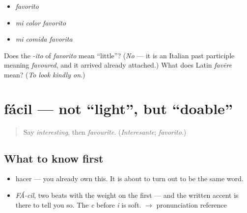 \begin{itemize}
\raggedright
  \item \emph{favorito}
  \item \emph{mi color favorito}
  \item \emph{mi comida favorita}
\end{itemize}

\begin{tcolorbox}[breakable,colback=teal!4,colframe=teal!35!black,title={Before you move on}]
Does the \emph{-ito} of \emph{favorito} mean \textquotedblleft{}little\textquotedblright{}? (\emph{No} — it is an Italian past participle meaning \emph{favoured}, and it arrived already attached.) What does Latin \emph{favēre} mean? (\emph{To look kindly on}.)
\end{tcolorbox}
\section[fácil]{fácil — not \textquotedblleft{}light\textquotedblright{}, but \textquotedblleft{}doable\textquotedblright{}}

\label{lesson:ES-C398-facil}



\begin{quote}
Say \emph{interesting}, then \emph{favourite}. (\emph{Interesante}; \emph{favorito}.)
\end{quote}

\subsection*{What to know first}
\begin{itemize}
\raggedright
  \item hacer — you already own this. It is about to turn out to be the same word.
\end{itemize}

\begin{sounds}
\begin{itemize}
\raggedright
  \item \emph{FÁ-cil}, two beats with the weight on the first — and the written accent is there to tell you so. The \emph{c} before \emph{i} is soft. $\to$ pronunciation reference
\end{itemize}
\end{sounds}

